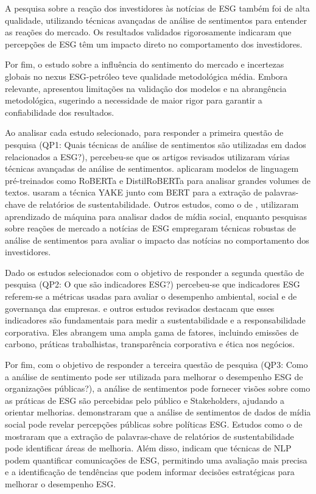 A pesquisa sobre a reação dos investidores às notícias de ESG também foi de alta qualidade,
utilizando técnicas avançadas de análise de sentimentos para entender as reações do mercado. Os
resultados validados rigorosamente indicaram que percepções de ESG têm um impacto direto no
comportamento dos investidores.

Por fim, o estudo sobre a influência do sentimento do mercado e incertezas globais no nexus
ESG-petróleo teve qualidade metodológica média. Embora relevante, apresentou limitações na
validação dos modelos e na abrangência metodológica, sugerindo a necessidade de maior rigor para
garantir a confiabilidade dos resultados.

Ao analisar cada estudo selecionado, para responder a primeira questão de pesquisa (QP1:
Quais técnicas de análise de sentimentos são utilizadas em dados relacionados a ESG?),
percebeu-se que os artigos revisados utilizaram várias técnicas avançadas de análise de sentimentos.
\citeauthor{schimanski2024} \citeyear{schimanski2024} aplicaram modelos de linguagem
pré-treinados como RoBERTa e DistilRoBERTa para analisar grandes volumes de textos.
\citeauthor{gupta2024} \citeyear{gupta2024} usaram a técnica YAKE junto com BERT para a
extração de palavras-chave de relatórios de sustentabilidade. Outros estudos, como o de
\citeauthor{liu2023esg} \citeyear{liu2023esg}, utilizaram aprendizado de máquina para analisar
dados de mídia social, enquanto pesquisas sobre reações de mercado a notícias de ESG empregaram
técnicas robustas de análise de sentimentos para avaliar o impacto das notícias no comportamento
dos investidores.

Dado os estudos selecionados com o objetivo de responder a segunda questão de pesquisa
(QP2: O que são indicadores ESG?) percebeu-se que indicadores ESG referem-se a métricas usadas
para avaliar o desempenho ambiental, social e de governança das empresas.
\citeauthor{schimanski2024} \citeyear{schimanski2024} e outros estudos revisados destacam que
esses indicadores são fundamentais para medir a sustentabilidade e a responsabilidade corporativa.
Eles abrangem uma ampla gama de fatores, incluindo emissões de carbono, práticas trabalhistas,
transparência corporativa e ética nos negócios.

Por fim, com o objetivo de responder a terceira questão de pesquisa (QP3: Como a análise de
sentimento pode ser utilizada para melhorar o desempenho ESG de organizações públicas?), a
análise de sentimentos pode fornecer visões sobre como as práticas de ESG são percebidas pelo
público e Stakeholders, ajudando a orientar melhorias. \citeauthor{liu2023esg}
\citeyear{liu2023esg} demonstraram que a análise de sentimentos de dados de mídia social pode
revelar percepções públicas sobre políticas ESG. Estudos como o de \citeauthor{gupta2024}
\citeyear{gupta2024} mostraram que a extração de palavras-chave de relatórios de sustentabilidade
pode identificar áreas de melhoria. Além disso, \citeauthor{schimanski2024}
\citeyear{schimanski2024} indicam que técnicas de NLP podem quantificar comunicações de ESG,
permitindo uma avaliação mais precisa e a identificação de tendências que podem informar decisões
estratégicas para melhorar o desempenho ESG.
